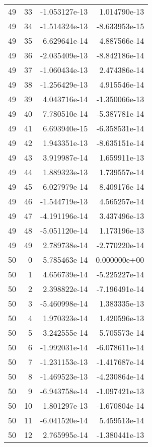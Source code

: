\begin{tabular}{rrrr}
  49 &   33 & -1.053127e-13 &  1.014790e-13 \\
  49 &   34 & -1.514324e-13 & -8.633953e-15 \\
  49 &   35 &  6.629641e-14 &  4.887566e-14 \\
  49 &   36 & -2.035409e-13 & -8.842186e-14 \\
  49 &   37 & -1.060434e-13 &  2.474386e-14 \\
  49 &   38 & -1.256429e-13 &  4.915546e-14 \\
  49 &   39 &  4.043716e-14 & -1.350066e-13 \\
  49 &   40 &  7.780510e-14 & -5.387781e-14 \\
  49 &   41 &  6.693940e-15 & -6.358531e-14 \\
  49 &   42 &  1.943351e-13 & -8.635151e-14 \\
  49 &   43 &  3.919987e-14 &  1.659911e-13 \\
  49 &   44 &  1.889323e-13 &  1.739557e-14 \\
  49 &   45 &  6.027979e-14 &  8.409176e-14 \\
  49 &   46 & -1.544719e-13 &  4.565257e-14 \\
  49 &   47 & -4.191196e-14 &  3.437496e-13 \\
  49 &   48 & -5.051120e-14 &  1.173196e-13 \\
  49 &   49 &  2.789738e-14 & -2.770220e-14 \\
  50 &    0 &  5.785463e-14 &  0.000000e+00 \\
  50 &    1 &  4.656739e-14 & -5.225227e-14 \\
  50 &    2 &  2.398822e-14 & -7.196491e-14 \\
  50 &    3 & -5.460998e-14 &  1.383335e-13 \\
  50 &    4 &  1.970323e-14 &  1.420596e-13 \\
  50 &    5 & -3.242555e-14 &  5.705573e-14 \\
  50 &    6 & -1.992031e-14 & -6.078611e-14 \\
  50 &    7 & -1.231153e-13 & -1.417687e-14 \\
  50 &    8 & -1.469523e-13 & -4.230864e-14 \\
  50 &    9 & -6.943758e-14 & -1.097421e-13 \\
  50 &   10 &  1.801297e-13 & -1.670804e-14 \\
  50 &   11 & -6.041520e-14 &  5.459513e-14 \\
  50 &   12 &  2.765995e-14 & -1.380441e-13 \\

\end{tabular}
